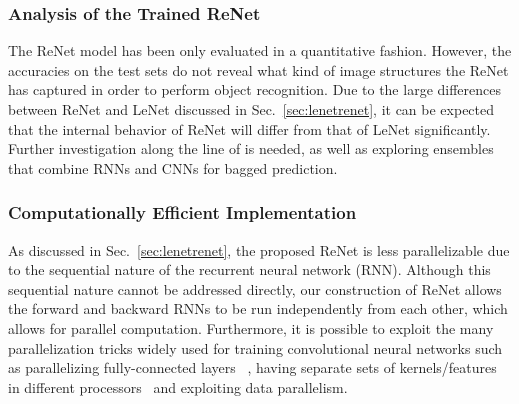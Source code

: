 \subsubsection{Analysis of the Trained ReNet}
The ReNet model has been only evaluated in a quantitative fashion. However, the
accuracies on the test sets do not reveal what kind of image structures the
ReNet has captured in order to perform object recognition. Due to the large
differences between ReNet and LeNet discussed in Sec.~\ref{sec:lenetrenet}, it
can be expected that the internal behavior of ReNet will differ from that of
LeNet significantly. Further investigation along the line of
\citep{ZeilerFergus14} is needed, as well as exploring ensembles that combine
RNNs and CNNs for bagged prediction.

\subsubsection{Computationally Efficient Implementation}
As discussed in Sec.~\ref{sec:lenetrenet}, the proposed ReNet is less
parallelizable due to the sequential nature of the recurrent neural network
(RNN). Although this sequential nature cannot be addressed directly, our
construction of ReNet allows the forward and backward RNNs to be run
independently from each other, which allows for parallel computation.
Furthermore, it is possible to exploit the many parallelization tricks widely
used for training convolutional neural networks such as parallelizing
fully-connected layers ~\citep{krizhevsky2014one}, having separate sets of
kernels/features in different processors~\citep{Krizhevsky-2012} and exploiting
data parallelism.
